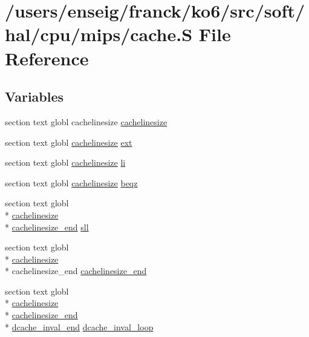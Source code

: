 \hypertarget{mips_2cache_8S}{\section{/users/enseig/franck/ko6/src/soft/hal/cpu/mips/cache.S File Reference}
\label{mips_2cache_8S}
}
\subsection*{Variables}
\begin{DoxyCompactItemize}
\item 
section text globl cachelinesize \hyperlink{mips_2cache_8S_a2ffad5962fec472ce41e46451bcd8f02}{cachelinesize}
\item 
section text globl \hyperlink{libc_8h_a7737fc4bdea8d6ab04f67ef74c3f1b9d}{cachelinesize} \hyperlink{mips_2cache_8S_a02cd0d788f29d77066a7350052ce390e}{ext}
\item 
section text globl \hyperlink{libc_8h_a7737fc4bdea8d6ab04f67ef74c3f1b9d}{cachelinesize} \hyperlink{mips_2cache_8S_a006417f92f633572be034047f70ba27b}{li}
\item 
section text globl \hyperlink{libc_8h_a7737fc4bdea8d6ab04f67ef74c3f1b9d}{cachelinesize} \hyperlink{mips_2cache_8S_ae8f5e5b3e81e22b99c4bd415ca4da91d}{beqz}
\item 
section text globl \\*
\hyperlink{libc_8h_a7737fc4bdea8d6ab04f67ef74c3f1b9d}{cachelinesize} \\*
\hyperlink{mips_2cache_8S_af5c24722116775c4c23de29430fa84bb}{cachelinesize\-\_\-end} \hyperlink{mips_2cache_8S_a5c1932d214a99dcd33423d675b3b860a}{sll}
\item 
section text globl \\*
\hyperlink{libc_8h_a7737fc4bdea8d6ab04f67ef74c3f1b9d}{cachelinesize} \\*
cachelinesize\-\_\-end \hyperlink{mips_2cache_8S_af5c24722116775c4c23de29430fa84bb}{cachelinesize\-\_\-end}
\item 
section text globl \\*
\hyperlink{libc_8h_a7737fc4bdea8d6ab04f67ef74c3f1b9d}{cachelinesize} \\*
\hyperlink{mips_2cache_8S_af5c24722116775c4c23de29430fa84bb}{cachelinesize\-\_\-end} \\*
\hyperlink{mips_2cache_8S_af97c183dce4888af33c2cb9b767bf0f5}{dcache\-\_\-inval\-\_\-end} \hyperlink{mips_2cache_8S_a459bb079d7d84a2808893e96da86d2df}{dcache\-\_\-inval\-\_\-loop}

\end{DoxyCompactItemize}
